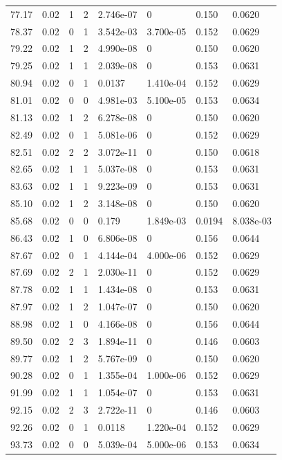\documentclass[preview]{standalone}
\begin{document}
{{{\begin{tabular}{L{1.2cm}C{1.2cm} C{0.3cm}C{0.5cm} C{1.4cm}C{1.4cm} C{1.4cm}C{1.4cm}}
  77.17  &  0.02  & 1     &  2 &  2.746e-07  & 0  & 0.150 &  0.0620   \\ 
  78.37  &  0.02  & 0     &  1 &  3.542e-03  & 3.700e-05  & 0.152 &  0.0629   \\ 
  79.22  &  0.02  & 1     &  2 &  4.990e-08  & 0  & 0.150 &  0.0620   \\ 
  79.25  &  0.02  & 1     &  1 &  2.039e-08  & 0  & 0.153 &  0.0631   \\ 
  80.94  &  0.02  & 0     &  1 &  0.0137  & 1.410e-04  & 0.152 &  0.0629   \\ 
  81.01  &  0.02  & 0     &  0 &  4.981e-03  & 5.100e-05  & 0.153 &  0.0634   \\ 
  81.13  &  0.02  & 1     &  2 &  6.278e-08  & 0  & 0.150 &  0.0620   \\ 
  82.49  &  0.02  & 0     &  1 &  5.081e-06  & 0  & 0.152 &  0.0629   \\ 
  82.51  &  0.02  & 2     &  2 &  3.072e-11  & 0  & 0.150 &  0.0618   \\ 
  82.65  &  0.02  & 1     &  1 &  5.037e-08  & 0  & 0.153 &  0.0631   \\ 
  83.63  &  0.02  & 1     &  1 &  9.223e-09  & 0  & 0.153 &  0.0631   \\ 
  85.10  &  0.02  & 1     &  2 &  3.148e-08  & 0  & 0.150 &  0.0620   \\ 
  85.68  &  0.02  & 0     &  0 &  0.179  & 1.849e-03  & 0.0194 &  8.038e-03   \\ 
  86.43  &  0.02  & 1     &  0 &  6.806e-08  & 0  & 0.156 &  0.0644   \\ 
  87.67  &  0.02  & 0     &  1 &  4.144e-04  & 4.000e-06  & 0.152 &  0.0629   \\ 
  87.69  &  0.02  & 2     &  1 &  2.030e-11  & 0  & 0.152 &  0.0629   \\ 
  87.78  &  0.02  & 1     &  1 &  1.434e-08  & 0  & 0.153 &  0.0631   \\ 
  87.97  &  0.02  & 1     &  2 &  1.047e-07  & 0  & 0.150 &  0.0620   \\ 
  88.98  &  0.02  & 1     &  0 &  4.166e-08  & 0  & 0.156 &  0.0644   \\ 
  89.50  &  0.02  & 2     &  3 &  1.894e-11  & 0  & 0.146 &  0.0603   \\ 
  89.77  &  0.02  & 1     &  2 &  5.767e-09  & 0  & 0.150 &  0.0620   \\ 
  90.28  &  0.02  & 0     &  1 &  1.355e-04  & 1.000e-06  & 0.152 &  0.0629   \\ 
  91.99  &  0.02  & 1     &  1 &  1.054e-07  & 0  & 0.153 &  0.0631   \\ 
  92.15  &  0.02  & 2     &  3 &  2.722e-11  & 0  & 0.146 &  0.0603   \\ 
  92.26  &  0.02  & 0     &  1 &  0.0118  & 1.220e-04  & 0.152 &  0.0629   \\ 
  93.73  &  0.02  & 0     &  0 &  5.039e-04  & 5.000e-06  & 0.153 &  0.0634   \\ 
\hline 
\end{tabular} 

}}}
\end{document}
